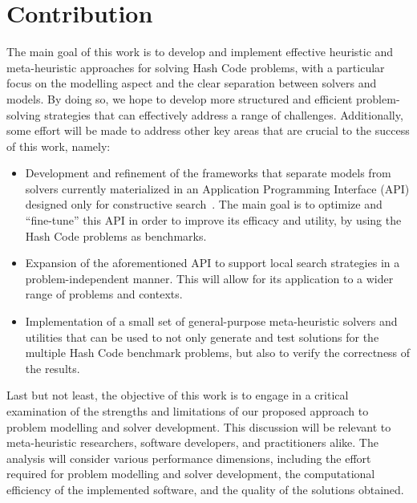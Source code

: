 \section{Contribution}
\label{section:contribution}

The main goal of this work is to develop and implement effective heuristic and
meta-heuristic approaches for solving Hash Code problems, with a particular
focus on the modelling aspect and the clear separation between solvers and
models.  By doing so, we hope to develop more structured and efficient
problem-solving strategies that can effectively address a range of challenges.
Additionally, some effort will be made to address other key areas that are
crucial to the success of this work, namely:

\begin{itemize}
      \item Development and refinement of the frameworks that separate models from solvers
            currently materialized in an Application Programming Interface (API)
            designed only for constructive search~\cite{outeiro2021application}.
            The main goal is to optimize and ``fine-tune'' this API in order to improve its
            efficacy and utility, by using the Hash Code problems as benchmarks.

      \item Expansion of the aforementioned API to support local search strategies
            in a problem-independent manner. This will allow for its application to a wider
            range of problems and contexts.

      \item Implementation of a small set of general-purpose meta-heuristic solvers and utilities
            that can be used to not only generate and test solutions for the multiple
            Hash Code benchmark problems, but also to verify the correctness of the results.
\end{itemize}

Last but not least, the objective of this work is to engage in a critical
examination of the strengths and limitations of our proposed approach to problem
modelling and solver development. This discussion will be relevant to
meta-heuristic researchers, software developers, and practitioners alike. The
analysis will consider various performance dimensions, including the effort
required for problem modelling and solver development, the computational
efficiency of the implemented software, and the quality of the solutions
obtained.

